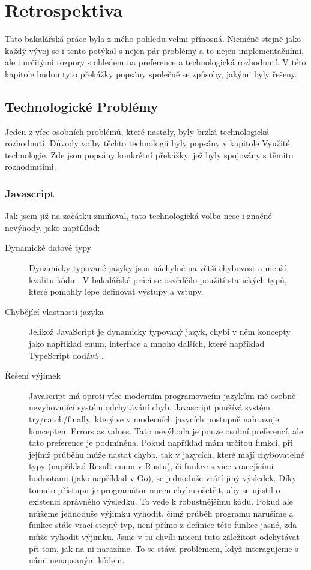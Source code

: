 \chapter{Retrospektiva}

Tato bakalářská práce byla z mého pohledu velmi přínosná. Nicméně stejně jako každý vývoj se i tento potýkal s nejen pár problémy a to nejen implementačními, ale i určitými rozpory s ohledem na preference a technologická rozhodnutí. V této kapitole budou tyto překážky popsány společně se způsoby, jakými byly řešeny.

\section{Technologické Problémy}

Jeden z více osobních problémů, které nastaly, byly brzká technologická rozhodnutí. Důvody volby těchto technologií byly popsány v kapitole Využité technologie. Zde jsou popsány konkrétní překážky, jež byly spojovány s těmito rozhodnutími.

\subsection{Javascript}
Jak jsem již na začátku zmiňoval, tato technologická volba nese i značné nevýhody, jako například:

\begin{description}
\item[Dynamické datové typy] 
Dynamicky typované jazyky jsou náchylné na větší chybovost a menší kvalitu kódu \cite{pang2018programming}. V bakalářské práci se osvědčilo použití statických typů, které pomohly lépe definovat výstupy a vstupy.
\item[Chybějící vlastnosti jazyka] 
Jelikož JavaScript je dynamicky typovaný jazyk, chybí v něm koncepty jako například enum, interface a mnoho dalších, které například TypeScript dodává \cite{typescriptlangHandbookEnums, typescriptlangHandbookInterfaces}.
\item[Řešení výjimek]
Javascript má oproti více moderním programovacím jazykům mě osobně nevyhovující systém odchytávání chyb. Javascript používá systém try/catch/finally, který se v moderních jazycích postupně nahrazuje konceptem Errors as values. Tato nevýhoda je pouze osobní preferencí, ale tato preference je podmíněna. Pokud například mám určitou funkci, při jejímž průběhu může nastat chyba, tak v jazycích, které mají chybovatelné typy (například Result enum v Rustu), či funkce s více vracejícími hodnotami (jako například v Go), se jednoduše vrátí jiný výsledek. Díky tomuto přístupu je programátor nucen chybu ošetřit, aby se ujistil o existenci správného výsledku. To vede k robustnějšímu kódu. Pokud ale můžeme jednoduše výjimku vyhodit, čímž průběh programu narušíme a funkce stále vrací stejný typ, není přímo z definice této funkce jasné, zda může vyhodit výjimku. Jsme v tu chvíli nuceni tuto záležitost odchytávat při tom, jak na ni narazíme. To se stává problémem, když interagujeme s námi nenapsaným kódem.
\end{description}

